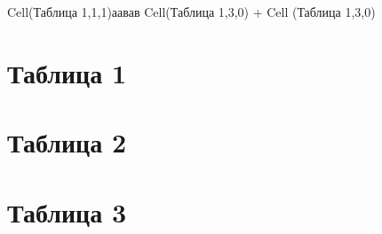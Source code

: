 \documentclass[a4paper,11pt]{article}
\begin{document}
Cell(Таблица 1,1,1)аавав  Cell(Таблица 1,3,0) +
Cell (Таблица 1,3,0)
	\section{Таблица 1}
	\section{Таблица 2}
	\section{Таблица 3}
\end{document}

